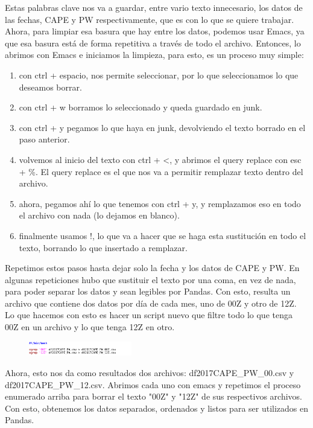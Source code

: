 \documentclass[a4paper]{article}
\begin{document}
Estas palabras clave nos va a guardar, entre vario texto innecesario, los datos de las fechas, CAPE y PW respectivamente, que es con lo que se quiere trabajar. 
 \smallskip
Ahora, para limpiar esa basura que hay entre los datos, podemos usar Emacs, ya que esa basura está de forma repetitiva a través de todo el archivo. Entonces, lo abrimos con Emacs e iniciamos la limpieza, para esto, es un proceso muy simple: 
 \begin{enumerate}
 \item con ctrl + espacio, nos permite seleccionar, por lo que seleccionamos lo que deseamos borrar.
  \item con ctrl + w borramos lo seleccionado y queda guardado en junk.
   \item con ctrl + y pegamos lo que haya en junk, devolviendo el texto borrado en el paso anterior.
    \item volvemos al inicio del texto con ctrl + <, y abrimos el query replace con esc +  \%. El query replace es el que nos va a permitir remplazar texto dentro del archivo.
     \item ahora, pegamos ahí lo que tenemos con ctrl + y, y remplazamos eso en todo el archivo con nada (lo dejamos en blanco).
      \item finalmente usamos !, lo que va a hacer que se haga esta sustitución en todo el texto, borrando lo que insertado a remplazar. 
 \end{enumerate}
Repetimos estos pasos hasta dejar solo la fecha y los datos de CAPE y PW. En algunas repeticiones hubo que sustituir el texto por una coma, en vez de nada, para poder separar los datos y sean legibles por Pandas. Con esto, resulta un archivo que contiene dos datos por día de cada mes, uno de 00Z y otro de 12Z. Lo que hacemos con esto es hacer un script nuevo que filtre todo lo que tenga 00Z en un archivo y lo que tenga 12Z en otro. 

\begin{figure}[h!]
 \centering
  \includegraphics[width=0.4\textwidth]{script2.png}
\end{figure}

Ahora, esto nos da como resultados dos archivos: df2017CAPE\_PW\_00.csv y df2017CAPE\_PW\_12.csv. Abrimos cada uno con emacs y repetimos el proceso enumerado arriba para borrar el texto "00Z" y "12Z" de sus respectivos archivos. Con esto, obtenemos los datos separados, ordenados y listos para ser utilizados en Pandas. 
\end{document}
